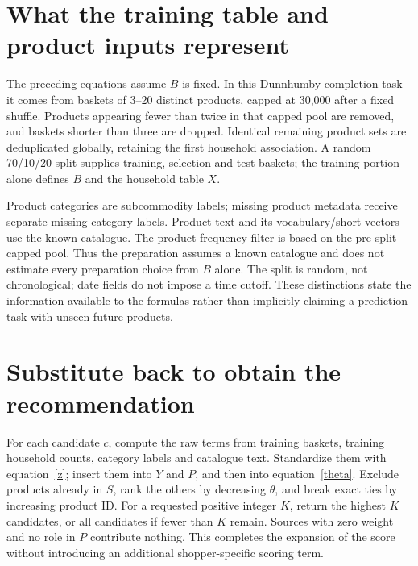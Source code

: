 \documentclass[11pt,a4paper]{article}
\numberwithin{equation}{section}
\begin{document}
\section{What the training table and product inputs represent}
The preceding equations assume $B$ is fixed. In this Dunnhumby completion task it comes
from baskets of 3--20 distinct products, capped at 30,000 after a fixed shuffle. Products
appearing fewer than twice in that capped pool are removed, and baskets shorter than three
are dropped. Identical remaining product sets are deduplicated globally, retaining the
first household association. A random 70/10/20 split supplies training, selection and test
baskets; the training portion alone defines $B$ and the household table $X$.

Product categories are subcommodity labels; missing product metadata receive separate
missing-category labels. Product text and its vocabulary/short vectors use the known
catalogue. The product-frequency filter is based on the pre-split capped pool. Thus the
preparation assumes a known catalogue and does not estimate every preparation choice from
$B$ alone. The split is random, not chronological; date fields do not impose a time cutoff.
These distinctions state the information available to the formulas rather than implicitly
claiming a prediction task with unseen future products.

\section{Substitute back to obtain the recommendation}
For each candidate $c$, compute the raw terms from training baskets, training household
counts, category labels and catalogue text. Standardize them with equation~\eqref{z};
insert them into $Y$ and $P$, and then into equation~\eqref{theta}. Exclude products already
in $S$, rank the others by decreasing $\theta$, and break exact ties by increasing product
ID. For a requested positive integer $K$, return the highest $K$ candidates, or all candidates if fewer than $K$ remain. Sources
with zero weight and no role in $P$ contribute nothing. This completes the expansion
of the score without introducing an additional shopper-specific scoring term.
\end{document}
